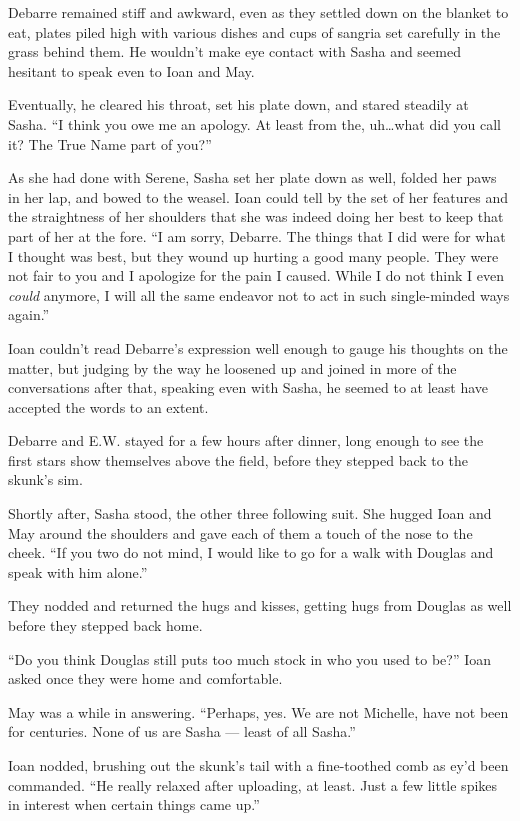 Debarre remained stiff and awkward, even as they settled down on the blanket to eat, plates piled high with various dishes and cups of sangria set carefully in the grass behind them. He wouldn't make eye contact with Sasha and seemed hesitant to speak even to Ioan and May.

Eventually, he cleared his throat, set his plate down, and stared steadily at Sasha. ``I think you owe me an apology. At least from the, uh\ldots what did you call it? The True Name part of you?''

As she had done with Serene, Sasha set her plate down as well, folded her paws in her lap, and bowed to the weasel. Ioan could tell by the set of her features and the straightness of her shoulders that she was indeed doing her best to keep that part of her at the fore. ``I am sorry, Debarre. The things that I did were for what I thought was best, but they wound up hurting a good many people. They were not fair to you and I apologize for the pain I caused. While I do not think I even \emph{could} anymore, I will all the same endeavor not to act in such single-minded ways again.''

Ioan couldn't read Debarre's expression well enough to gauge his thoughts on the matter, but judging by the way he loosened up and joined in more of the conversations after that, speaking even with Sasha, he seemed to at least have accepted the words to an extent.

Debarre and E.W. stayed for a few hours after dinner, long enough to see the first stars show themselves above the field, before they stepped back to the skunk's sim.

Shortly after, Sasha stood, the other three following suit. She hugged Ioan and May around the shoulders and gave each of them a touch of the nose to the cheek. ``If you two do not mind, I would like to go for a walk with Douglas and speak with him alone.''

They nodded and returned the hugs and kisses, getting hugs from Douglas as well before they stepped back home.

``Do you think Douglas still puts too much stock in who you used to be?'' Ioan asked once they were home and comfortable.

May was a while in answering. ``Perhaps, yes. We are not Michelle, have not been for centuries. None of us are Sasha — least of all Sasha.''

Ioan nodded, brushing out the skunk's tail with a fine-toothed comb as ey'd been commanded. ``He really relaxed after uploading, at least. Just a few little spikes in interest when certain things came up.''

